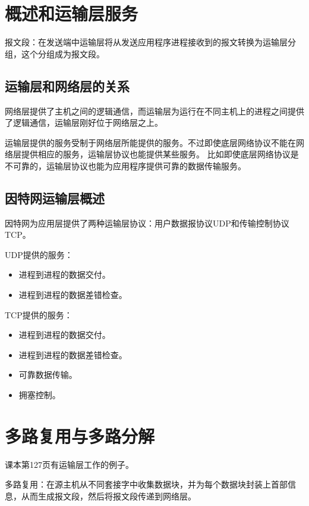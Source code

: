 \documentclass[a4paper,left=2.5cm,right=2.5cm,11pt]{article}
\begin{document}


\section{概述和运输层服务}
	报文段：在发送端中运输层将从发送应用程序进程接收到的报文转换为运输层分组，这个分组成为报文段。

\subsection{运输层和网络层的关系}
	网络层提供了主机之间的逻辑通信，而运输层为运行在不同主机上的进程之间提供了逻辑通信，运输层刚好位于网络层之上。\par

	运输层提供的服务受制于网络层所能提供的服务。不过即使底层网络协议不能在网络层提供相应的服务，运输层协议也能提供某些服务。
	比如即使底层网络协议是不可靠的，运输层协议也能为应用程序提供可靠的数据传输服务。

\subsection{因特网运输层概述}
	因特网为应用层提供了两种运输层协议：用户数据报协议UDP和传输控制协议TCP。\par

	UDP提供的服务：
	\begin{itemize}
		\item 进程到进程的数据交付。
		\item 进程到进程的数据差错检查。
	\end{itemize}

	TCP提供的服务：
	\begin{itemize}
		\item 进程到进程的数据交付。
		\item 进程到进程的数据差错检查。
		\item 可靠数据传输。
		\item 拥塞控制。
	\end{itemize}

\section{多路复用与多路分解}
	课本第127页有运输层工作的例子。\par

	多路复用：在源主机从不同套接字中收集数据块，并为每个数据块封装上首部信息，从而生成报文段，然后将报文段传递到网络层。\par
\end{document}
